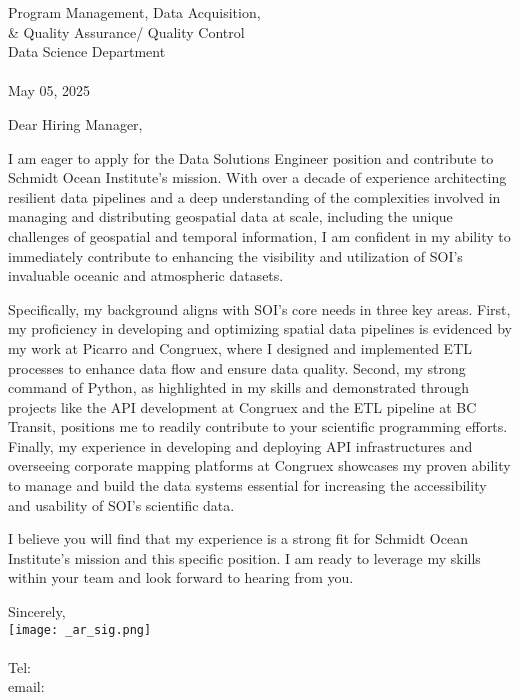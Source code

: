 \documentclass[letterpaper]{article}
\begin{document}
\large
Program Management, Data Acquisition, \\
\qquad \& Quality Assurance/ Quality Control \\
Data Science Department \\
\textbf{\JobCompany} \\

\null\hfill May 05, 2025

Dear Hiring Manager,

I am eager to apply for the Data Solutions Engineer position and contribute to Schmidt Ocean Institute's mission.
With over a decade of experience architecting resilient data pipelines and a deep understanding of the
complexities involved in managing and distributing geospatial data at scale,
including the unique challenges of geospatial and temporal information, I am confident in my ability to immediately contribute to enhancing the visibility
and utilization of SOI's invaluable oceanic and atmospheric datasets.

Specifically, my background aligns with SOI's core needs in three key areas.
First, my proficiency in developing and optimizing spatial data pipelines is evidenced by my work at Picarro and Congruex, where I designed and implemented
ETL processes to enhance data flow and ensure data quality.
Second, my strong command of Python, as highlighted in my skills and demonstrated through
projects like the API development at Congruex and the ETL pipeline at BC Transit, positions me to
readily contribute to your scientific programming
efforts.
Finally, my experience in developing and deploying API infrastructures and overseeing corporate mapping
platforms at Congruex showcases my proven ability to manage and build the data systems essential for increasing the
accessibility and usability of SOI’s scientific data.

I believe you will find that my experience is a strong fit for Schmidt Ocean
Institute’s mission and this specific position.
I am ready to leverage my skills within your team and look forward to hearing from you.

Sincerely,\\
    \hspace{1em}
    \texttt{[image: \_ar\_sig.png]} \\
    \CVsigname \\
    \small
    Tel: \CVphone \\
    email: \CVemail
\end{document}

